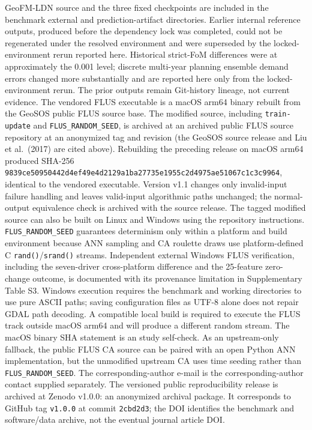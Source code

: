 GeoFM-LDN source and the three fixed checkpoints are included in the
benchmark external and prediction-artifact directories. Earlier internal
reference outputs, produced before the dependency lock was completed,
could not be regenerated under the resolved environment and were
superseded by the locked-environment rerun reported here. Historical
strict-FoM differences were at approximately the 0.001 level; discrete
multi-year planning ensemble demand errors changed more substantially
and are reported here only from the locked-environment rerun. The prior
outputs remain Git-history lineage, not current evidence. The vendored
FLUS executable is a macOS arm64 binary rebuilt from the GeoSOS public
FLUS source base. The modified source, including \texttt{train-update}
and \texttt{FLUS\_RANDOM\_SEED}, is archived at an archived public FLUS
source repository at an anonymized tag and revision (the GeoSOS source
release and Liu et al.~(2017) are cited above). Rebuilding the preceding
release on macOS arm64 produced SHA-256
\texttt{9839ce50950442d4ef49e4d2129a1ba27735e1955c2d4975ae51067c1c3c9964},
identical to the vendored executable. Version v1.1 changes only
invalid-input failure handling and leaves valid-input algorithmic paths
unchanged; the normal-output equivalence check is archived with the
source release. The tagged modified source can also be built on Linux
and Windows using the repository instructions.
\texttt{FLUS\_RANDOM\_SEED} guarantees determinism only within a
platform and build environment because ANN sampling and CA roulette
draws use platform-defined C \texttt{rand()}/\texttt{srand()} streams.
Independent external Windows FLUS verification, including the
seven-driver cross-platform difference and the 25-feature zero-change
outcome, is documented with its provenance limitation in Supplementary
Table S3. Windows execution requires the benchmark and working
directories to use pure ASCII paths; saving configuration files as UTF-8
alone does not repair GDAL path decoding. A compatible local build is
required to execute the FLUS track outside macOS arm64 and will produce
a different random stream. The macOS binary SHA statement is an study
self-check. As an upstream-only fallback, the public FLUS CA source can
be paired with an open Python ANN implementation, but the unmodified
upstream CA uses time seeding rather than \texttt{FLUS\_RANDOM\_SEED}.
The corresponding-author e-mail is the corresponding-author contact
supplied separately. The versioned public reproducibility release is
archived at Zenodo v1.0.0: an anonymized archival package. It
corresponds to GitHub tag \texttt{v1.0.0} at commit \texttt{2cbd2d3};
the DOI identifies the benchmark and software/data archive, not the
eventual journal article DOI.

